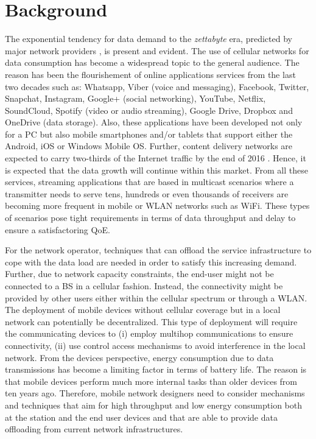\section{Background}\label{sec:background}
The exponential tendency for data demand to the \textit{zettabyte} era, predicted by major network providers \cite{cisco2016forecast,kremling2015presentation,belllabs2016report,ericsson2015report}, is present and evident. The use of cellular networks for data consumption has become a widespread topic to the general audience. The reason has been the flourishement of online applications services from the last two decades such as:  Whatsapp, Viber (voice and messaging), Facebook, Twitter, Snapchat, Instagram, Google+ (social networking), YouTube, Netflix, SoundCloud, Spotify (video or audio streaming), Google Drive, Dropbox and OneDrive (data storage). Also, these applications have been developed not only for a \ac{PC} but also mobile smartphones and/or tablets that support either the Android, iOS or Windows Mobile \ac{OS}. Further, content delivery networks are expected to carry two-thirds of the Internet traffic by the end of 2016 \cite{cisco2016forecast}. Hence, it is expected that the data growth will continue within this market. From all these services, streaming applications that are based in multicast scenarios where a transmitter needs to serve tens, hundreds or even thousands of receivers are becoming more frequent in mobile or \ac{WLAN} networks such as \ac{WiFi}. These types of scenarios pose tight requirements in terms of data throughput and delay to ensure a satisfactoring \ac{QoE}.

For the network operator, techniques that can offload the service infrastructure to cope with the data load are needed in order to satisfy this increasing demand. Further, due to network capacity constraints, the end-user might not be connected to a \ac{BS} in a cellular fashion. Instead, the connectivity might be provided by other users either within the cellular spectrum or through a \ac{WLAN}. The deployment of mobile devices without cellular coverage but in a local network can potentially be decentralized. This type of deployment will require the communicating devices to (i) employ multihop communications to ensure connectivity, (ii) use control access mechanisms to avoid interference in the local network. From the devices perspective, energy consumption due to data transmissions has become a limiting factor in terms of battery life. The reason is that mobile devices perform much more internal tasks than older devices from ten years ago. Therefore, mobile network designers need to consider mechanisms and techniques that aim for high throughput and low energy consumption both at the station and the end user devices and that are able to provide data offloading from current network infrastructures.

